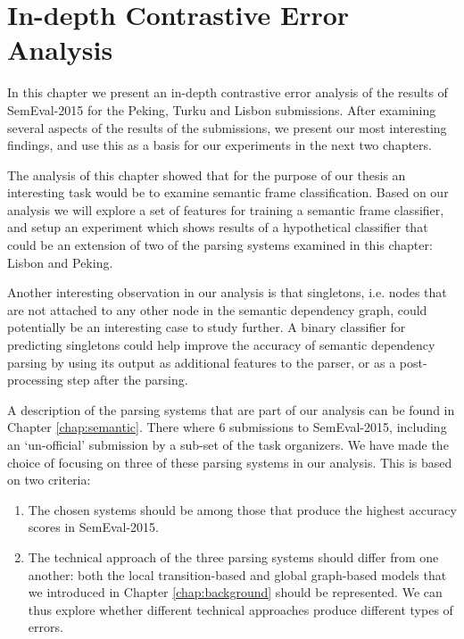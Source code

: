 \chapter{In-depth Contrastive Error Analysis}
\label{chap:analysis}



In this chapter we present an in-depth contrastive error analysis of the results of SemEval-2015 for the Peking, Turku and Lisbon submissions. After examining several aspects of the results of the submissions, we present our most interesting findings, and use this as a basis for our experiments in the next two chapters. 

The analysis of this chapter showed that for the purpose of our thesis an interesting task would be to examine semantic frame classification. Based on our analysis we will explore a set of features for training a semantic frame classifier, and setup an experiment which shows results of a hypothetical classifier that could be an extension of two of the parsing systems examined in this chapter: Lisbon and Peking.

Another interesting observation in our analysis is that singletons, i.e. nodes that are not attached to any other node in the semantic dependency graph, could potentially be an interesting case to study further. A binary classifier for predicting singletons could help improve the accuracy of semantic dependency parsing by using its output as additional features to the parser, or as a post-processing step after the parsing.

A description of the parsing systems that are part of our analysis can be found in Chapter \ref{chap:semantic}. There where 6 submissions to SemEval-2015, including an `un-official' submission by a sub-set of the task organizers. We have made the choice of focusing on three of these parsing systems in our analysis. This is based on two criteria:

\begin{enumerate}
    \item The chosen systems should be among those that produce the highest accuracy scores in SemEval-2015.
    \item The technical approach of the three parsing systems should differ from one another: both the local transition-based and global graph-based models that we introduced in Chapter \ref{chap:background} should be represented. We can thus explore whether different technical approaches produce different types of errors.
\end{enumerate}


